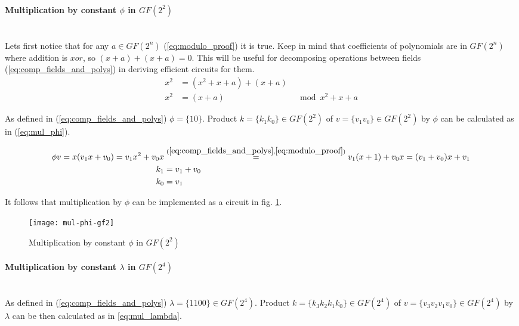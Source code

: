 \paragraph{Multiplication by constant $\phi$ in $GF(2^2)$}\mbox{}\\
Lets first notice that for any $a \in GF(2^n)$ (\ref{eq:modulo_proof}) it is true. Keep in mind that coefficients of polynomials are in $GF(2^n)$ where addition is $xor$, so $(x + a) + (x + a) = 0$. This will be useful for decomposing operations between fields (\ref{eq:comp_fields_and_polys}) in deriving efficient circuits for them.
\begin{equation}
\label{eq:modulo_proof}
\begin{aligned}
x^2 &= (x^2 + x + a) + (x + a) &\\
x^2 &= (x + a)                 &\mod  x^2 + x + a
\end{aligned}
\end{equation}

As defined in (\ref{eq:comp_fields_and_polys}) $\phi = \{10\}$. Product $k = \{k_1k_0\} \in GF(2^2)$ of $v = \{v_1v_0\} \in GF(2^2)$ by $\phi$ can be calculated as in (\ref{eq:mul_phi}).

\begin{equation}
\label{eq:mul_phi}
\begin{aligned}
\phi v = x (v_1x + v_0) = v_1x^2 + v_0x &\stackrel{(\ref{eq:comp_fields_and_polys}, \ref{eq:modulo_proof})}{=} v_1(x + 1) + v_0x = (v_1 + v_0)x + v_1\\
k_1 &= v_1 + v_0\\
k_0 &= v_1
\end{aligned}
\end{equation}

It follows that multiplication by $\phi$ can be implemented as a circuit in fig. \ref{fig:phi_mul}.

\begin{figure}[!h]
\centering
\texttt{[image: mul-phi-gf2]}
\caption{Multiplication by constant $\phi$ in $GF(2^2)$}
\label{fig:phi_mul}
\end{figure}


\paragraph{Multiplication by constant $\lambda$ in $GF(2^4)$}\mbox{}\\
As defined in (\ref{eq:comp_fields_and_polys}) $\lambda = \{1100\} \in GF(2^4)$. Product $k = \{k_3k_2k_1k_0\} \in GF(2^4)$ of $v = \{v_3v_2v_1v_0\} \in GF(2^4)$ by $\lambda$ can be then calculated as in \ref{eq:mul_lambda}.

